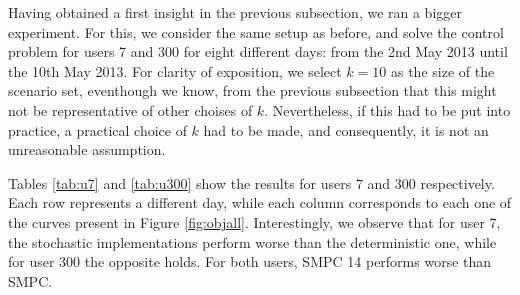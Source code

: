 \documentclass[11pt]{article}
\theoremstyle{definition}
\begin{document}
Having obtained a first insight in the previous subsection, we ran a bigger experiment. For this, we consider the same setup as before, and solve the control problem for users 7 and 300 for eight different days: from the 2nd May 2013 until the 10th May 2013. 
For clarity of exposition, we select $k=10$ as the size of the scenario set, eventhough we know, from the previous subsection that this might not be representative of other choises of $k$. Nevertheless, if this had to be put into practice, a practical choice of $k$ had to be made, and consequently, it is not an unreasonable assumption.

Tables \ref{tab:u7} and \ref{tab:u300} show the results for users 7 and 300 respectively. Each row represents a different day, while each column corresponds to each one of the curves present in Figure \ref{fig:objall}.
Interestingly, we observe that for user 7, the stochastic implementations perform worse than the deterministic one, while for user 300 the opposite holds. For both users, SMPC 14 performs worse than SMPC.

%
\end{document}
